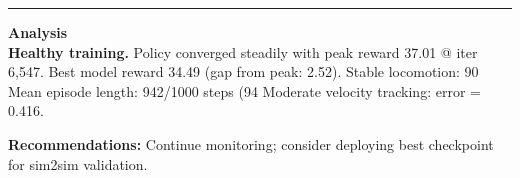 \documentclass[a4paper,10pt]{article}
\begin{document}
\vspace{2pt}
\hrule
\vspace{2pt}

\footnotesize
\textbf{Analysis} \\[1pt]
\textbf{Healthy training.} Policy converged steadily with peak reward 37.01 @ iter 6,547.
Best model reward 34.49 (gap from peak: 2.52).
Stable locomotion: 90%
Mean episode length: 942/1000 steps (94%
Moderate velocity tracking: error = 0.416.

\textbf{Recommendations:}
Continue monitoring; consider deploying best checkpoint for sim2sim validation.
\end{document}
